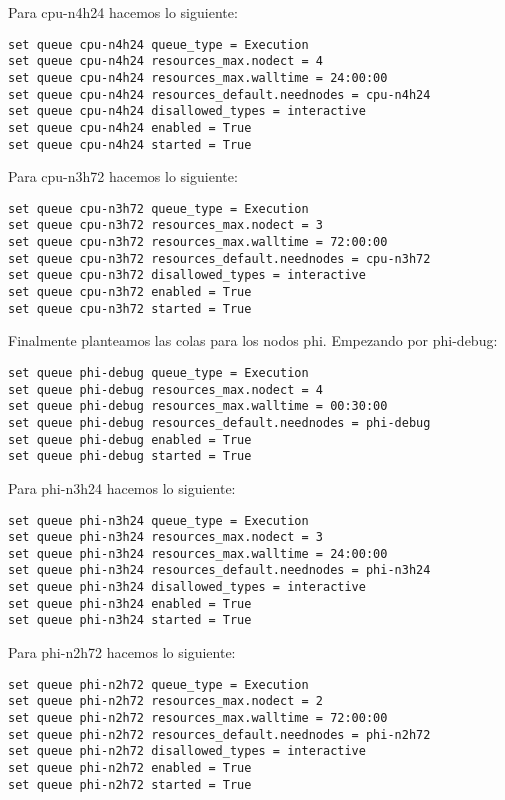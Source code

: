 Para cpu-n4h24 hacemos lo siguiente:

\begin{lstlisting}
set queue cpu-n4h24 queue_type = Execution
set queue cpu-n4h24 resources_max.nodect = 4
set queue cpu-n4h24 resources_max.walltime = 24:00:00
set queue cpu-n4h24 resources_default.neednodes = cpu-n4h24
set queue cpu-n4h24 disallowed_types = interactive
set queue cpu-n4h24 enabled = True
set queue cpu-n4h24 started = True
\end{lstlisting}

Para cpu-n3h72 hacemos lo siguiente:

\begin{lstlisting}
set queue cpu-n3h72 queue_type = Execution
set queue cpu-n3h72 resources_max.nodect = 3
set queue cpu-n3h72 resources_max.walltime = 72:00:00
set queue cpu-n3h72 resources_default.neednodes = cpu-n3h72
set queue cpu-n3h72 disallowed_types = interactive
set queue cpu-n3h72 enabled = True
set queue cpu-n3h72 started = True
\end{lstlisting}

Finalmente planteamos las colas para los nodos phi. Empezando por phi-debug:

\begin{lstlisting}
set queue phi-debug queue_type = Execution
set queue phi-debug resources_max.nodect = 4
set queue phi-debug resources_max.walltime = 00:30:00
set queue phi-debug resources_default.neednodes = phi-debug
set queue phi-debug enabled = True
set queue phi-debug started = True
\end{lstlisting}

Para phi-n3h24 hacemos lo siguiente:

\begin{lstlisting}
set queue phi-n3h24 queue_type = Execution
set queue phi-n3h24 resources_max.nodect = 3
set queue phi-n3h24 resources_max.walltime = 24:00:00
set queue phi-n3h24 resources_default.neednodes = phi-n3h24
set queue phi-n3h24 disallowed_types = interactive
set queue phi-n3h24 enabled = True
set queue phi-n3h24 started = True
\end{lstlisting}

Para phi-n2h72 hacemos lo siguiente:

\begin{lstlisting}
set queue phi-n2h72 queue_type = Execution
set queue phi-n2h72 resources_max.nodect = 2
set queue phi-n2h72 resources_max.walltime = 72:00:00
set queue phi-n2h72 resources_default.neednodes = phi-n2h72
set queue phi-n2h72 disallowed_types = interactive
set queue phi-n2h72 enabled = True
set queue phi-n2h72 started = True
\end{lstlisting}

